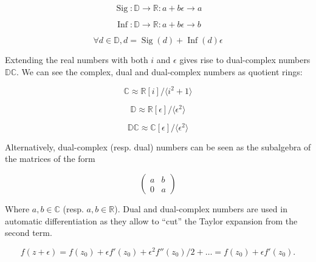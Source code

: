 \documentclass{article}
\newcommand{\R}{\mathbb{R}}
\newcommand{\C}{\mathbb{C}}
\newcommand{\D}{\mathbb{D}}
\newcommand{\DC}{\mathbb{DC}}
\newcommand{\e}{\epsilon}
\newcommand{\Sig}{\operatorname{Sig}}
\newcommand{\Inf}{\operatorname{Inf}}
\begin{document}
\begin{multicols}{3}
\noindent
\begin{equation}
\Sig: \D \to \R: a + b\e \to a
\end{equation}

\columnbreak
\noindent
\begin{equation}
\Inf: \D \to \R: a + b\e \to b
\end{equation}

\columnbreak
\noindent
\begin{equation}
\forall d \in \D, d = \Sig(d) + \Inf(d)\e
\end{equation}

\end{multicols}

Extending the real numbers with both $i$ and $\e$ gives rise to dual-complex numbers $\DC$. We can see the complex, dual and dual-complex numbers as quotient rings:

\begin{multicols}{3}

\noindent
\begin{equation}
\C \approx \R [i]/\langle i^2+1 \rangle
\end{equation}

\columnbreak

\noindent
\begin{equation}
\D \approx \R [\e]/\langle \e^2 \rangle
\end{equation}

\columnbreak

\noindent
\begin{equation}
\DC \approx \C [\e]/\langle \e^2 \rangle
\end{equation}
\end{multicols}

Alternatively, dual-complex (resp. dual) numbers can be seen as the subalgebra of the matrices of the form

\begin{equation}
\begin{pmatrix}
 a & b\\
 0 & a
\end{pmatrix}
\end{equation}

Where $a, b \in \C$ (resp. $a, b \in \R$). Dual and dual-complex numbers are used in automatic differentiation as they allow to ``cut'' the Taylor expansion from the second term. \cite{baydin2018, rev2016}

\begin{equation}
f(z + \e) = f(z_0) + \e f'(z_0) + \e^2 f''(z_0)/2 + \dots = f(z_0) + \e f'(z_0).
\end{equation}
\end{document}
